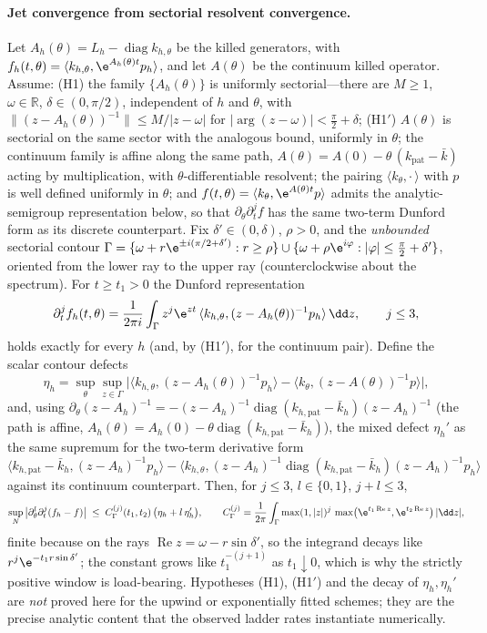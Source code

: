 \paragraph{Jet convergence from sectorial resolvent convergence.}
Let \(A_h(\theta)=L_h-\operatorname{diag}k_{h,\theta}\) be the killed
generators, with
\(f_h(t,\theta)=\langle k_{h,\theta},\e^{A_h(\theta)t}p_h\rangle\), and let
\(A(\theta)\) be the continuum killed operator. Assume:
(H1) the family \(\{A_h(\theta)\}\) is uniformly sectorial---there are
\(M\ge1\), \(\omega\in\mathbb R\), \(\delta\in(0,\pi/2)\), independent of
\(h\) and \(\theta\), with \(\|(z-A_h(\theta))^{-1}\|\le M/|z-\omega|\) for
\(|\arg(z-\omega)|<\tfrac\pi2+\delta\);
(H1$'$) \(A(\theta)\) is sectorial on the same sector with the analogous
bound, uniformly in \(\theta\); the continuum family is affine along the
same path, \(A(\theta)=A(0)-\theta\,(k_{\mathrm{pat}}-\bar k)\) acting by
multiplication, with \(\theta\)-differentiable resolvent; the pairing
\(\langle k_\theta,\cdot\,\rangle\) with \(p\) is well defined uniformly in
\(\theta\); and \(f(t,\theta)=\langle k_\theta,\e^{A(\theta)t}p\rangle\)
admits the analytic-semigroup representation below, so that
\(\partial_\theta\partial_t^jf\) has the same two-term Dunford form as its
discrete counterpart. Fix \(\delta'\in(0,\delta)\), \(\rho>0\), and the
\emph{unbounded} sectorial contour
\(\Gamma=\{\omega+r\e^{\pm i(\pi/2+\delta')}:r\ge\rho\}\cup
\{\omega+\rho\e^{i\varphi}:|\varphi|\le\tfrac\pi2+\delta'\}\),
oriented from the lower ray to the upper ray (counterclockwise about the
spectrum). For \(t\ge t_1>0\) the Dunford representation
\[
\partial_t^jf_h(t,\theta)
=\frac1{2\pi i}\int_\Gamma z^j\e^{zt}\,
\langle k_{h,\theta},(z-A_h(\theta))^{-1}p_h\rangle\,\dd z,
\qquad j\le3,
\]
holds exactly for every \(h\) (and, by (H1$'$), for the continuum pair).
Define the scalar contour defects
\[
\eta_h=\sup_{\theta}\sup_{z\in\Gamma}
\big|\langle k_{h,\theta},(z-A_h(\theta))^{-1}p_h\rangle
-\langle k_{\theta},(z-A(\theta))^{-1}p\rangle\big|,
\]
and, using
\(\partial_\theta(z-A_h)^{-1}=-(z-A_h)^{-1}
\operatorname{diag}(k_{h,\mathrm{pat}}-\bar k_h)(z-A_h)^{-1}\)
(the path is affine,
\(A_h(\theta)=A_h(0)-\theta\operatorname{diag}(k_{h,\mathrm{pat}}-\bar k_h)\)),
the mixed defect \(\eta_h'\) as the same supremum for the two-term derivative
form
\(\langle k_{h,\mathrm{pat}}-\bar k_h,(z-A_h)^{-1}p_h\rangle
-\langle k_{h,\theta},(z-A_h)^{-1}
\operatorname{diag}(k_{h,\mathrm{pat}}-\bar k_h)(z-A_h)^{-1}p_h\rangle\)
against its continuum counterpart. Then, for \(j\le3\), \(l\in\{0,1\}\),
\(j+l\le3\),
\[
\sup_N\big|\partial_\theta^l\partial_t^j(f_h-f)\big|
\;\le\;C_\Gamma^{(j)}(t_1,t_2)\,\big(\eta_h+l\,\eta_h'\big),
\qquad
C_\Gamma^{(j)}
=\frac1{2\pi}\int_\Gamma\max(1,|z|)^{j}\,
\max\!\big(\e^{t_1\operatorname{Re}z},\e^{t_2\operatorname{Re}z}\big)
\,|\dd z|,
\]
finite because on the rays
\(\operatorname{Re}z=\omega-r\sin\delta'\), so the integrand decays like
\(r^{j}\e^{-t_1r\sin\delta'}\); the constant grows like
\(t_1^{-(j+1)}\) as \(t_1\downarrow0\), which is why the strictly positive
window is load-bearing. Hypotheses (H1), (H1$'$) and the decay of
\(\eta_h,\eta_h'\) are \emph{not} proved here for the upwind or
exponentially fitted schemes; they are the precise analytic content that the
observed ladder rates instantiate numerically.

